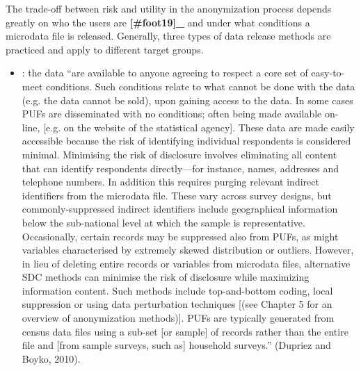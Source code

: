 \documentclass[letterpaper,10pt,english]{sphinxmanual}
\begin{document}
The trade-off between risk and utility in the anonymization process
depends greatly on who the users are {\color{red}\bfseries{}{[}\#foot19{]}\_} and under
what conditions a microdata file is released. Generally, three types of
data release methods are practiced and apply to different target groups.
\begin{itemize}
\item {} 
: the data “are available to anyone agreeing
to respect a core set of easy-to-meet conditions. Such conditions
relate to what cannot be done with the data (e.g. the data cannot be
sold), upon gaining access to the data. In some cases PUFs are
disseminated with no conditions; often being made available on-line,
{[}e.g. on the website of the statistical agency{]}. These data are made
easily accessible because the risk of identifying individual
respondents is considered minimal. Minimising the risk of disclosure
involves eliminating all content that can identify respondents
directly—for instance, names, addresses and telephone numbers. In
addition this requires purging relevant indirect identifiers from the
microdata file. These vary across survey designs, but
commonly-suppressed indirect identifiers include geographical
information below the sub-national level at which the sample is
representative. Occasionally, certain records may be suppressed also
from PUFs, as might variables characterised by extremely skewed
distribution or outliers. However, in lieu of deleting entire records
or variables from microdata files, alternative SDC methods can
minimise the risk of disclosure while maximizing information content.
Such methods include top-and-bottom coding, local suppression or
using data perturbation techniques {[}(see Chapter 5 for an overview of
anonymization methods){]}. PUFs are typically generated from census
data files using a sub-set {[}or sample{]} of records rather than the
entire file and {[}from sample surveys, such as{]} household surveys.”
(Dupriez and Boyko, 2010).


\end{itemize}
\end{document}
